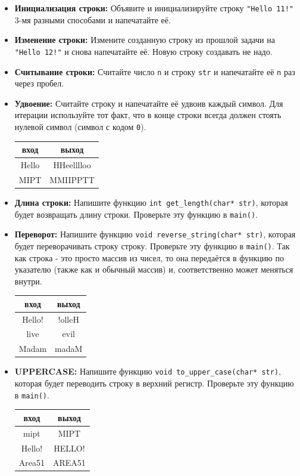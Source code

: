 \documentclass{article}
\begin{document}
\begin{itemize}
\item \textbf{Инициализация строки:} Объявите и инициализируйте строку \texttt{"Hello 11!"} 3-мя разными способами и напечатайте её.
\item \textbf{Изменение строки:} Измените созданную строку из прошлой задачи на \texttt{"Hello 12!"} и снова напечатайте её. Новую строку создавать не надо.
\item \textbf{Считывание строки:} Считайте число \texttt{n} и строку \texttt{str} и напечатайте её \texttt{n} раз через пробел.
\item \textbf{Удвоение:} Считайте строку и напечатайте её удвоив каждый символ. Для итерации используйте тот факт, что в конце строки всегда должен стоять нулевой символ (символ с кодом \texttt{0}).
\begin{center}
\begin{tabular}{ c | c }
 вход & выход \\ \hline
 Hello & HHeelllloo  \\ 
 MIPT & MMIIPPTT  \\ 
\end{tabular}
\end{center}
\item \textbf{Длина строки:} Напишите функцию \texttt{int get\_length(char* str)}, которая будет возвращать длину строки. Проверьте эту функцию в \texttt{main()}.
\item \textbf{Переворот:} Напишите функцию \texttt{void reverse\_string(char* str)}, которая будет переворачивать строку строку. Проверьте эту функцию в \texttt{main()}. Так как строка - это просто массив из чисел, то она передаётся в функцию по указателю (также как и обычный массив) и, соответственно может меняться внутри.
\begin{center}
\begin{tabular}{ c | c }
 вход & выход \\ \hline
 Hello! & !olleH  \\ 
 live & evil  \\ 
 Madam & madaM  \\ 
\end{tabular}
\end{center}

\item \textbf{UPPERCASE:} Напишите функцию \texttt{void to\_upper\_case(char* str)}, которая будет переводить строку в верхний регистр. Проверьте эту функцию в \texttt{main()}.
\begin{center}
\begin{tabular}{ c | c }
 вход & выход \\ \hline
 mipt & MIPT \\
 Hello! & HELLO!  \\ 
 Area51 & AREA51 \\
\end{tabular}
\end{center}


\end{itemize}
\end{document}
